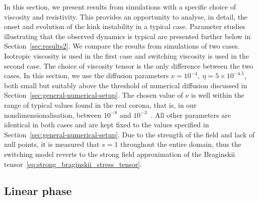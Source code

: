 In this section, we present results from simulations with a
specific choice of viscosity and resistivity. This provides an
opportunity to analyse, in detail, the onset and evolution of the kink
instability in a typical case. Parameter studies illustrating that
the observed dynamics is typical are presented further below
in Section~\ref{sec:results2}.
We compare the results from simulations of two
cases. Isotropic viscosity is used in the first case and switching
  viscosity is used in the second case. The choice of viscosity
tensor is the only difference between the two cases. In this
  section, we use the diffusion parameters $\nu = 10^{-4},\ \eta =
5\times 10^{-4.5}$, both small but suitably above the threshold of
numerical diffusion discussed in
Section~\ref{sec:general-numerical-setup}. The chosen value of $\nu$ is well within the range of typical values found in the real corona, that is, in our nondimensionalisation, between $10^{-8}$ and $10^{-3}$~\cite{rudermanSlowSurfaceWave2000a}. All other parameters are
identical in both cases and are kept fixed to the values specified in
Section~\ref{sec:general-numerical-setup}. Due to the strength of the field and lack of null points, it is measured that $s=1$ throughout the entire domain, thus the switching model reverts to the strong field approximation of the Braginskii tensor~\eqref{eq:strong_braginskii_stress_tensor}.

\subsection{Linear phase}

